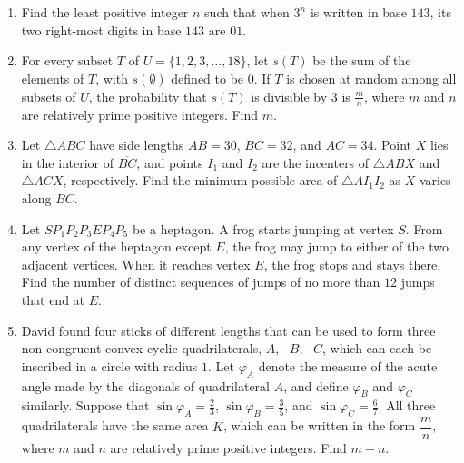 \documentclass{article}
\begin{document}
\begin{enumerate}[label=\arabic*., itemsep=0.5em]
\par \vspace{0.5em}\item Find the least positive integer $n$ such that when $3^n$ is written in base $143$, its two right-most digits in base $143$ are $01$.\par \vspace{0.5em}\item For every subset $T$ of $U = \{ 1,2,3,\ldots,18 \}$, let $s(T)$ be the sum of the elements of $T$, with $s(\emptyset)$ defined to be $0$. If $T$ is chosen at random among all subsets of $U$, the probability that $s(T)$ is divisible by $3$ is $\frac{m}{n}$, where $m$ and $n$ are relatively prime positive integers. Find $m$.\par \vspace{0.5em}\item Let $\triangle ABC$ have side lengths $AB=30$, $BC=32$, and $AC=34$. Point $X$ lies in the interior of $\overline{BC}$, and points $I_1$ and $I_2$ are the incenters of $\triangle ABX$ and $\triangle ACX$, respectively. Find the minimum possible area of $\triangle AI_1I_2$ as $X$ varies along $\overline{BC}$.\par \vspace{0.5em}\item Let $SP_1P_2P_3EP_4P_5$ be a heptagon. A frog starts jumping at vertex $S$. From any vertex of the heptagon except $E$, the frog may jump to either of the two adjacent vertices. When it reaches vertex $E$, the frog stops and stays there. Find the number of distinct sequences of jumps of no more than $12$ jumps that end at $E$.\par \vspace{0.5em}\item David found four sticks of different lengths that can be used to form three non-congruent convex cyclic quadrilaterals, $A,\text{ }B,\text{ }C$, which can each be inscribed in a circle with radius $1$. Let $\varphi_A$ denote the measure of the acute angle made by the diagonals of quadrilateral $A$, and define $\varphi_B$ and $\varphi_C$ similarly. Suppose that $\sin\varphi_A=\frac{2}{3}$, $\sin\varphi_B=\frac{3}{5}$, and $\sin\varphi_C=\frac{6}{7}$. All three quadrilaterals have the same area $K$, which can be written in the form $\dfrac{m}{n}$, where $m$ and $n$ are relatively prime positive integers. Find $m+n$.




\end{enumerate}
\end{document}

